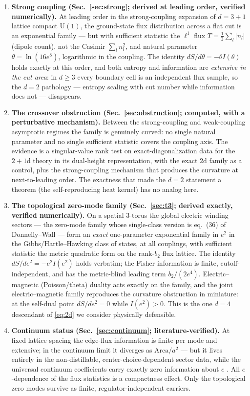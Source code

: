 \documentclass[11pt]{article}
\theoremstyle{remark}
\theoremstyle{plain}
\begin{document}
\begin{enumerate}
\item \textbf{Strong coupling (Sec.~\ref{sec:strong}; derived at leading order, verified numerically).} At leading order in the strong-coupling expansion of $d=3{+}1$ lattice compact $\mathrm{U}(1)$, the ground-state flux distribution across a flat cut is an exponential family --- but with sufficient statistic the $\ell^1$ flux $T = \tfrac12 \sum_l |n_l|$ (dipole count), not the Casimir $\sum_l n_l^2$, and natural parameter $\theta = \ln(16 e^8)$, logarithmic in the coupling. The identity $dS/d\theta = -\theta I(\theta)$ holds exactly at this order, and both entropy and information are \emph{extensive in the cut area}: in $d \geq 3$ every boundary cell is an independent flux sample, so the $d=2$ pathology --- entropy scaling with cut number while information does not \cite{P3} --- disappears.
\item \textbf{The crossover obstruction (Sec.~\ref{sec:obstruction}; computed, with a perturbative mechanism).} Between the strong-coupling and weak-coupling asymptotic regimes the family is genuinely curved: no single natural parameter and no single sufficient statistic covers the coupling axis. The evidence is a singular-value rank test on exact-diagonalization data for the $2{+}1$d theory in its dual-height representation, with the exact 2d family as a control, plus the strong-coupling mechanism that produces the curvature at next-to-leading order. The exactness that made the $d=2$ statement a theorem (the self-reproducing heat kernel) has no analog here.
\item \textbf{The topological zero-mode family (Sec.~\ref{sec:t3}; derived exactly, verified numerically).} On a spatial 3-torus the global electric winding sectors --- the zero-mode family whose single-class version is eq.~(36) of Donnelly--Wall \cite{DW16} --- form an \emph{exact} one-parameter exponential family in $e^2$ in the Gibbs/Hartle--Hawking class of states, at all couplings, with sufficient statistic the metric quadratic form on the rank-$b_2$ flux lattice. The identity $dS/de^2 = -e^2 I(e^2)$ holds verbatim; the Fisher information is finite, cutoff-independent, and has the metric-blind leading term $b_2/(2e^4)$. Electric--magnetic (Poisson/theta) duality acts exactly on the family, and the joint electric--magnetic family reproduces the curvature obstruction in miniature: at the self-dual point $dS/de^2 = 0$ while $I(e^2) > 0$. This is the one $d=4$ descendant of \eqref{eq:2d} we consider physically defensible.
\item \textbf{Continuum status (Sec.~\ref{sec:continuum}; literature-verified).} At fixed lattice spacing the edge-flux information is finite per mode and extensive; in the continuum limit it diverges as $\mathrm{Area}/a^2$ --- but it lives entirely in the non-distillable, center-choice-dependent sector data, while the universal continuum coefficients carry exactly zero information about $e$ \cite{CH15, CHMP}. All $e$-dependence of the flux statistics is a compactness effect. Only the topological zero modes survive as finite, regulator-independent carriers.
\end{enumerate}
\end{document}
